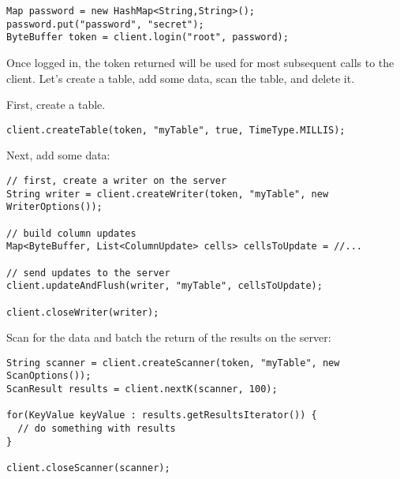 \small
\begin{verbatim}
Map password = new HashMap<String,String>();
password.put("password", "secret");
ByteBuffer token = client.login("root", password);
\end{verbatim}
\normalsize

Once logged in, the token returned will be used for most subsequent calls to the client.
Let's create a table, add some data, scan the table, and delete it.


First, create a table.

\small
\begin{verbatim}
client.createTable(token, "myTable", true, TimeType.MILLIS);
\end{verbatim}
\normalsize


Next, add some data:

\small
\begin{verbatim}
// first, create a writer on the server
String writer = client.createWriter(token, "myTable", new WriterOptions());

// build column updates
Map<ByteBuffer, List<ColumnUpdate> cells> cellsToUpdate = //...

// send updates to the server
client.updateAndFlush(writer, "myTable", cellsToUpdate);

client.closeWriter(writer);
\end{verbatim}
\normalsize


Scan for the data and batch the return of the results on the server:

\small
\begin{verbatim}
String scanner = client.createScanner(token, "myTable", new ScanOptions());
ScanResult results = client.nextK(scanner, 100);

for(KeyValue keyValue : results.getResultsIterator()) {
  // do something with results
}

client.closeScanner(scanner);
\end{verbatim}
\normalsize